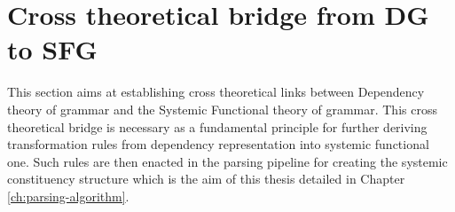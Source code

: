 %

\section{Cross theoretical bridge from DG to SFG}
\label{sec:cross-theoretical-bridge}
\label{sec:dependecy-relations-sfl}



%
This section aims at establishing cross theoretical links between Dependency theory of grammar and the Systemic Functional theory of grammar. This cross theoretical bridge is necessary as a fundamental principle for further deriving transformation rules from dependency representation into systemic functional one. Such rules are then enacted in the parsing pipeline for creating the systemic constituency structure which is the aim of this thesis detailed in Chapter \ref{ch:parsing-algorithm}.

